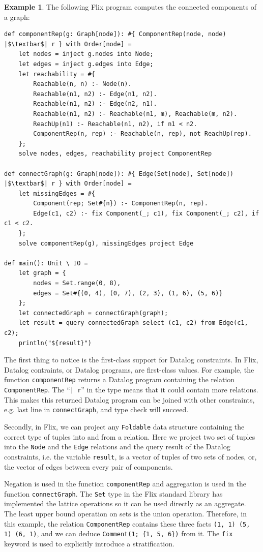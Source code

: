 \documentclass[11pt]{report}
\theoremstyle{definition}
\newtheorem{exmp}{Example}[chapter]
\begin{document}
\begin{exmp}
  The following Flix program computes the connected components of a graph:
  \begin{verbatim}
def componentRep(g: Graph[node]): #{ ComponentRep(node, node) |$\textbar$| r } with Order[node] =
    let nodes = inject g.nodes into Node;
    let edges = inject g.edges into Edge;
    let reachability = #{
        Reachable(n, n) :- Node(n).
        Reachable(n1, n2) :- Edge(n1, n2).
        Reachable(n1, n2) :- Edge(n2, n1).
        Reachable(n1, n2) :- Reachable(n1, m), Reachable(m, n2).
        ReachUp(n1) :- Reachable(n1, n2), if n1 < n2.
        ComponentRep(n, rep) :- Reachable(n, rep), not ReachUp(rep).
    };
    solve nodes, edges, reachability project ComponentRep

def connectGraph(g: Graph[node]): #{ Edge(Set[node], Set[node]) |$\textbar$| r } with Order[node] =
    let missingEdges = #{
        Component(rep; Set#{n}) :- ComponentRep(n, rep).
        Edge(c1, c2) :- fix Component(_; c1), fix Component(_; c2), if c1 < c2.
    };
    solve componentRep(g), missingEdges project Edge

def main(): Unit \ IO =
    let graph = {
        nodes = Set.range(0, 8),
        edges = Set#{(0, 4), (0, 7), (2, 3), (1, 6), (5, 6)}
    };
    let connectedGraph = connectGraph(graph);
    let result = query connectedGraph select (c1, c2) from Edge(c1, c2);
    println("${result}")
\end{verbatim}

  The first thing to notice is the first-class support for Datalog constraints. In Flix, Datalog contraints, or Datalog programs, are first-class values. For example, the function \texttt{componentRep} returns a Datalog program containing the relation \texttt{ComponentRep}. The ``\texttt{| r}'' in the type means that it could contain more relations. This makes this returned Datalog program can be joined with other constraints, e.g. last line in \texttt{connectGraph}, and type check will succeed.

  Secondly, in Flix, we can project any \texttt{Foldable} data structure containing the correct type of tuples into and from a relation. Here we project two set of tuples into the \texttt{Node} and the \texttt{Edge} relations and the query result of the Datalog constraints, i.e. the variable \texttt{result}, is a vector of tuples of two sets of nodes, or, the vector of edges between every pair of components.

  Negation is used in the function \texttt{componentRep} and aggregation is used in the function \texttt{connectGraph}. The \texttt{Set} type in the Flix standard library has implemented the lattice operations so it can be used directly as an aggregate. The least upper bound operation on sets is the union operation. Therefore, in this example, the relation \texttt{ComponentRep} contains these three facts \texttt{(1, 1) (5, 1) (6, 1)}, and we can deduce \texttt{Comment(1; \{1, 5, 6\})} from it. The \texttt{fix} keyword is used to explicitly introduce a stratification.

\end{exmp}
\label{exmp:flix-program}
\end{document}
